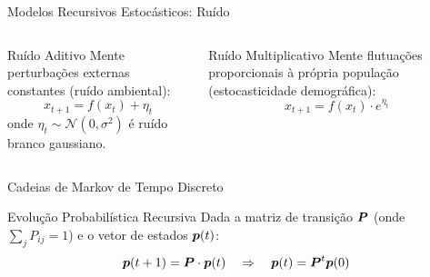 \begin{frame}[allowframebreaks]{Modelos Recursivos Estocásticos: Ruído}

\begin{columns}
\begin{block}{Ruído Aditivo}
Mente perturbações externas constantes (ruído ambiental):
\begin{equation*}
x_{t+1} = f(x_t) + \eta_t
\end{equation*}
onde $\eta_t \sim \mathcal{N}(0, \sigma^2)$ é ruído branco gaussiano.
\end{block}

\begin{block}{Ruído Multiplicativo}
Mente flutuações proporcionais à própria população (estocasticidade demográfica):
\begin{equation*}
x_{t+1} = f(x_t) \cdot e^{\eta_t}
\end{equation*}
\end{block}
\end{columns}

\vspace{0.2cm}
\end{frame}

\begin{frame}{Cadeias de Markov de Tempo Discreto}

\begin{block}{Evolução Probabilística Recursiva}
Dada a matriz de transição $\boldsymbol{P}$ (onde $\sum_{j} P_{ij} = 1$) e o vetor de estados $\boldsymbol{p}(t)$:
\begin{equation*}
\boldsymbol{p}(t+1) = \boldsymbol{P} \cdot \boldsymbol{p}(t) \quad \Rightarrow \quad \boldsymbol{p}(t) = \boldsymbol{P}^t \boldsymbol{p}(0)
\end{equation*}
\end{block}
\end{frame}

